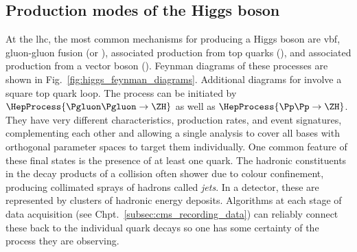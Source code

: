 

\subsection{Production modes of the Higgs boson}
\label{subsec:theory_higgs_production_modes}

At the \acrshort{lhc}, the most common mechanisms for producing a Higgs boson are \acrfull{vbf}, gluon-gluon fusion (\ggF or \ggH), associated production from top quarks (\ttH), and associated production from a vector boson (\VH). Feynman diagrams of these processes are shown in Fig.~\ref{fig:higgs_feynman_diagrams}. Additional diagrams for \ggH involve a square top quark loop. The \ZH process can be initiated by $\HepProcess{\Pgluon\Pgluon\to \ZH}$ as well as $\HepProcess{\Pp\Pp \to \ZH}$. They have very different characteristics, production rates, and event signatures, complementing each other and allowing a single analysis to cover all bases with orthogonal parameter spaces to target them individually. One common feature of these final states is the presence of at least one quark. The hadronic constituents in the decay products of a collision often shower due to colour confinement, producing collimated sprays of hadrons called \emph{\glspl{jet}}. In a detector, these are represented by clusters of hadronic energy deposits. Algorithms at each stage of data acquisition (see Chpt.~\ref{subsec:cms_recording_data}) can reliably connect these back to the individual quark decays so one has some certainty of the process they are observing.

